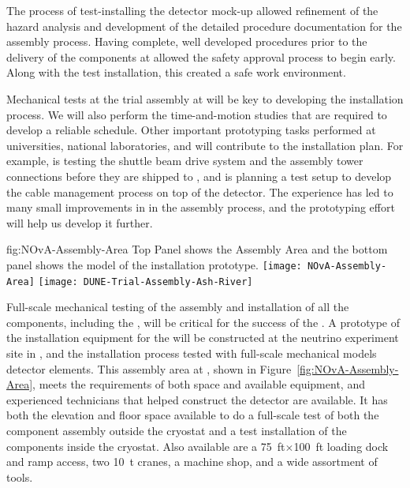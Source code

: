 The process of test-installing the detector mock-up allowed refinement of the hazard analysis and development of the detailed procedure documentation for the assembly process. 
Having complete, well developed procedures prior to the delivery of the components at  allowed the safety approval process to begin early. Along with the test installation, this created a safe work environment.


Mechanical tests at the  trial assembly at   will be key to developing the installation process. We will also perform the time-and-motion studies that are required to develop a reliable schedule.  Other important prototyping tasks performed at  universities, national laboratories, and  will contribute to the installation plan. 
For example,  is testing the  shuttle beam drive system and the  assembly tower connections before they are shipped to , and  is planning a test setup to develop the cable management process on top of the detector. 
The  experience has led to many small improvements in 
in the assembly process, and the  prototyping effort will help us develop it further. 


\begin{dunefigure}
{fig:NOvA-Assembly-Area}
{Top Panel shows the  Assembly Area and the bottom panel shows the \threed model of the installation prototype.}                
\texttt{[image: NOvA-Assembly-Area]}
\vspace{-12pt}
\texttt{[image: DUNE-Trial-Assembly-Ash-River]}
\end{dunefigure}

Full-scale mechanical testing of the assembly and installation of all the  components, including the , will be critical for the success of the . 
A prototype of the installation equipment for the   will be constructed at the  neutrino experiment  site in , %
and the installation process tested with full-scale mechanical models detector elements.  
This assembly area at , shown in Figure~\ref{fig:NOvA-Assembly-Area}, meets the requirements of both space and available equipment, and experienced technicians that helped construct the  detector are available. 
It has both the elevation and floor space available to do a full-scale test of both the component assembly outside the cryostat and a test installation of the  components  inside the
cryostat. 
Also available are a \SI{75}{ft}$\times$\SI{100}{ft} loading dock and ramp access, two \SI{10}{t} cranes, a machine shop, and a wide assortment of tools. 


